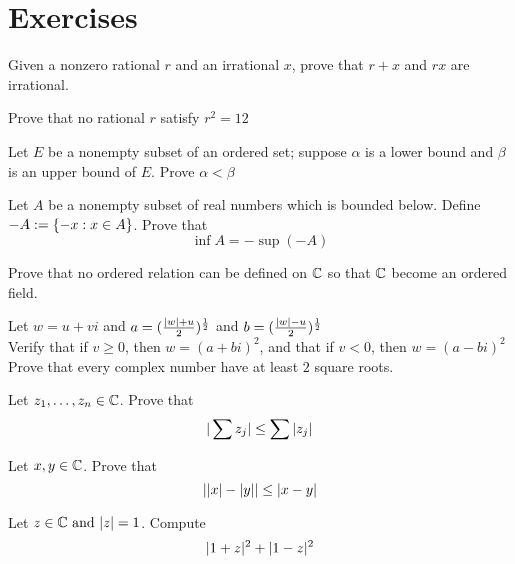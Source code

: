 \documentclass{report}
\begin{document}
\section{Exercises}
\begin{question}{}{}
Given a nonzero rational $r$ and an irrational $x$, prove that $r+x$ and $rx$ are irrational. 
\end{question}
\begin{question}{}{}
Prove that no rational $r$ satisfy  $r^2=12$
\end{question}
\begin{question}{}{}
Let $E$ be a nonempty subset of an ordered set; suppose $\alpha$ is a lower bound and $\beta$ is an upper bound of $E$. Prove $\alpha<\beta$ 
\end{question}
\begin{question}{}{}
Let $A$ be a nonempty subset of real numbers which is bounded below.  Define $-A:=\{ -x: x\in A \}$. Prove that
\begin{equation}
\inf A=-\sup (-A)
\end{equation}
\end{question}
\begin{question}{}{}
Prove that no ordered relation can be defined on $\mathbb{C}$ so that $\mathbb{C}$ become an ordered field.
\end{question}
\begin{question}{}{}
Let $w=u+vi$ and  $a=(\frac{|w|+u}{2})^{\frac{1}{2}}$ and $b=(\frac{|w|-u}{2})^{\frac{1}{2}}$ \\

Verify that if $v\geq 0$, then  $w=(a+bi)^2$, and that if $v<0$, then $w=(a-bi)^2$\\

Prove that every complex number have at least $2$ square roots.
\end{question}
\begin{question}{}{}
Let $z_1,\dots ,z_n\in\mathbb{C}$. Prove that
\begin{equation}
|\sum z_j|\leq \sum |z_j|
\end{equation}
\end{question}
\begin{question}{}{}
Let $x,y\in\mathbb{C}$. Prove that
 \begin{equation}
||x|-|y||\leq |x-y|
\end{equation}
\end{question}
\begin{question}{}{}
Let $z\in\mathbb{C}\text{ and }|z|=1$. Compute
\begin{equation}
|1+z|^2+|1-z|^2
\end{equation}
\end{question}
\end{document}

